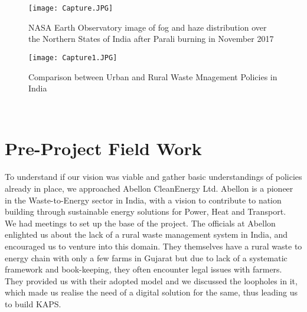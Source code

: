 \documentclass[conference]{IEEEtran}
\begin{document}
\begin{figure}[htbp]
\centerline{\texttt{[image: Capture.JPG]}}
\caption{NASA Earth Observatory image of fog and haze distribution over the Northern States of
India after Parali burning in November 2017 }
\label{fig:1}
\end{figure}
\begin{figure}[htbp]
\centerline{\texttt{[image: Capture1.JPG]}}
\caption{Comparison between Urban and Rural Waste Mnagement Policies in India}
\label{fig:2}
\end{figure}\\
\thispagestyle{firstpage}

\section{Pre-Project Field Work}
To understand if our vision was viable and gather basic understandings of policies already in place, we approached Abellon CleanEnergy Ltd\cite{b2}. Abellon is a pioneer in the Waste-to-Energy sector in India, with a vision to contribute to nation building through sustainable energy solutions for Power, Heat and Transport. \\
We had meetings to set up the base of the project. The officials at Abellon enlighted us about the lack of a rural waste management system in India, and encouraged us to venture into this domain. They themselves have a rural waste to energy chain with only a few farms in Gujarat but due to lack of a systematic framework and book-keeping, they often encounter legal issues with farmers. \\
They provided us with their adopted model and we discussed the loopholes in it, which made us realise the need of a digital solution for the same, thus leading us to build KAPS.
\end{document}
